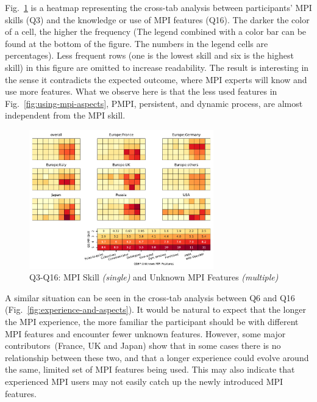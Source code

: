 \documentclass[preprint,5p,times]{elsarticle}
\newcommand{\revision}[2]{{\color{blue}#2}}
\def\mcountries{major contributors\xspace{}}%
\begin{document}
Fig.~\ref{fig:skill-and-aspects} is a heatmap representing the cross-tab
analysis between participants' MPI skills (Q3) and the knowledge or use of MPI
features (Q16). The darker the color of a cell, the higher the frequency (The legend
combined with a color bar can be found at the bottom of the figure. The numbers in
the legend cells are percentages). Less frequent rows (\revision{1}{one} is the lowest skill and
\revision{6}{six} is the highest skill) in this figure are omitted to increase readability. The
result is interesting in the sense it \revision{goes against}{contradicts} the expected outcome, where
MPI experts will know and use more features. What we observe here is that the
less used features in Fig.~\ref{fig:using-mpi-aspects}, PMPI, persistent, and
dynamic process, are almost independent from the MPI skill.


\begin{figure}[tb]
  \begin{center}
    \includegraphics[width=8.0cm]{Figs/Q3-Q16.pdf}
    \vspace{-1.5mm}
    \caption{Q3-Q16: MPI Skill {\it(single)} and Unknown MPI Features {\it(multiple)}}
    \label{fig:skill-and-aspects}
\vspace{-3mm}%
  \end{center}
\end{figure}

A similar situation can be seen in the cross-tab analysis between Q6 and Q16
(Fig.~\ref{fig:experience-and-aspects}). It would be natural to expect that the
longer the MPI experience, the more familiar the participant should be with
different MPI features and encounter fewer unknown features. However, some
\mcountries\ (France, UK and Japan) show that in some cases there is no
relationship between these two, and that a longer experience could evolve around
the same, limited set of MPI features being used.  This may also indicate that
experienced MPI users may not easily catch up the newly introduced MPI features.
\end{document}
